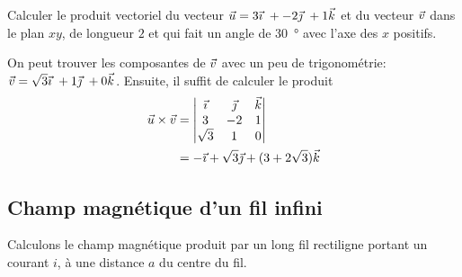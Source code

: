 \begin{diapobox}

Calculer le produit vectoriel du vecteur $\vec{u} = 3 \vec{\imath}\ + -2 \vec{\jmath}\ + 1 \vec{k}$ et du
vecteur $\vec{v}$ dans le plan $xy$, de longueur $2$ et qui fait un angle de
\SI{30}{\degree} avec l'axe des $x$ positifs.
\end{diapobox}

\begin{reponsebox}
  On peut trouver les composantes de $\vec{v}$ avec un peu de trigonométrie: $\vec{v} =
  \sqrt{3} \vec{\imath}\ + 1 \vec{\jmath}\ + 0 \vec{k}$. Ensuite, il suffit de calculer le produit
  \begin{align*}
    \vec{u} \times \vec{v} &= \begin{vmatrix}
      \vec{\imath}     &  \vec{\jmath}  &  \vec{k}  \\
      3         &  -2     &  1      \\
      \sqrt{3}  &  1      &  0
    \end{vmatrix}  \\
  &= -\vec{\imath} + \sqrt{3} \vec{\jmath} + (3 + 2 \sqrt{3})\vec{k}
  \end{align*}
\end{reponsebox}




\subsection*{Champ magnétique d'un fil infini}

Calculons le champ magnétique produit par un long fil rectiligne portant un
courant $i$, à une distance $a$ du centre du fil.


